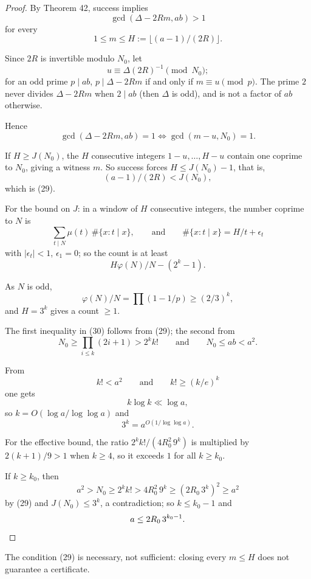 \documentclass[11pt,reqno]{amsart}
\theoremstyle{definition}
\theoremstyle{remark}
\begin{document}
\begin{proof}\leavevmode\label{proof:44}
By Theorem 42, success implies
\[
\gcd(\Delta-2Rm,ab)>1
\]
for
every
\[
1\le m\le H:=\lfloor(a-1)/(2R)\rfloor.
\]

Since \(2R\) is
invertible modulo \(N_0\), let
\[
u\equiv\Delta(2R)^{-1}\pmod{N_0};
\]
for
an odd prime \(p\mid ab\), \(p\mid\Delta-2Rm\) if and only if
\(m\equiv u\pmod p\). The prime \(2\) never divides \(\Delta-2Rm\) when
\(2\mid ab\) (then \(\Delta\) is odd), and is not a factor of \(ab\)
otherwise.

Hence
\[
\gcd(\Delta-2Rm,ab)=1\iff\gcd(m-u,N_0)=1.
\]

If
\(H\ge J(N_0)\), the \(H\) consecutive integers \(1-u,\ldots,H-u\)
contain one coprime to \(N_0\), giving a witness \(m\). So success
forces \(H\le J(N_0)-1\), that is,
\[
(a-1)/(2R)<J(N_0),
\]
which is
(29).

For the bound on \(J\): in a window of \(H\) consecutive integers, the
number coprime to \(N\) is
\[
\sum_{t\mid N}\mu(t)\,\#\{x:t\mid x\},
\qquad\text{and}\qquad
\#\{x:t\mid x\}=H/t+\epsilon_t
\]
with \(|\epsilon_t|<1\),
\(\epsilon_1=0\); so the count is at least
\[
H\varphi(N)/N-(2^k-1).
\]

As \(N\) is odd,
\[
\varphi(N)/N=\prod(1-1/p)\ge(2/3)^k,
\]
and \(H=3^k\) gives a count
\(\ge1\).

The first inequality in (30) follows from (29); the second from
\[
N_0\ge\prod_{i\le k}(2i+1)>2^kk!\qquad \text{and}\qquad N_0\le ab<a^2.
\]

From
\[
k!<a^2\qquad \text{and}\qquad k!\ge(k/e)^k
\]
one gets
\[
k\log k\ll\log a,
\]
so
\(k=O(\log a/\log\log a)\) and
\[
3^k=a^{O(1/\log\log a)}.
\]

For the effective bound, the ratio \(2^kk!/(4R_0^2\,9^k)\) is multiplied
by \(2(k+1)/9>1\) when \(k\ge4\), so it exceeds \(1\) for all
\(k\ge k_0\).

If \(k\ge k_0\), then
\[
a^2>N_0\ge2^kk!>4R_0^2\,9^k\ge(2R_0\,3^k)^2\ge a^2
\]
by (29) and
\(J(N_0)\le3^k\), a contradiction; so \(k\le k_0-1\) and
\[
a\le2R_0\,3^{k_0-1}.\qedhere
\]
\end{proof}

The condition (29) is necessary, not sufficient: closing every \(m\le H\)
does not guarantee a certificate.
\end{document}
